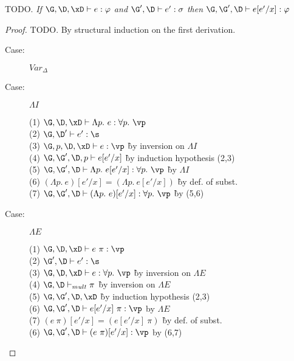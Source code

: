 
\begin{lemma}
  TODO.
\emph{If $\G, \D, \xD \vdash e : \varphi$ and $\G', \D \vdash e' : \sigma$
        then $\G, \G', \D \vdash e[e'/x] : \varphi$}
\end{lemma}
\begin{proof}
TODO. By structural induction on the first derivation.

\begin{description}

\item[Case:] $Var_\Delta$
\begin{tabbing}
\end{tabbing}

\item[Case:] $\Lambda I$
\begin{tabbing}
    (1) $\G,\D, \xD \vdash \Lambda p.~e : \forall p.~\vp$\\
    (2) $\G, \D' \vdash e' : \s$\\
    (3) $\G, p, \D, \xD \vdash e : \vp$ \` by inversion on $\Lambda I$\\
    (4) $\G, \G', \D, p \vdash e[e'/x]$ \` by induction hypothesis (2,3)\\
    (5) $\G, \G', \D \vdash \Lambda p.~e[e'/x] : \forall p.~\vp$ \` by $\Lambda I$ \\
    (6) $(\Lambda p.~e)[e'/x] = (\Lambda p.~e[e'/x])$ \` by def. of subst.\\
    (7) $\G, \G', \D \vdash (\Lambda p.~e)[e'/x] : \forall p.~\vp$ \` by (5,6)\\
\end{tabbing}

\item[Case:] $\Lambda E$
\begin{tabbing}
    (1) $\G, \D, \xD \vdash e~\pi : \vp$\\
    (2) $\G', \D \vdash e' : \s$\\
    (3) $\G, \D, \xD \vdash e : \forall p.~\vp$ \` by inversion on $\Lambda E$\\
    (4) $\G, \D \vdash_{mult} \pi$ \` by inversion on $\Lambda E$\\
    (5) $\G, \G', \D, \xD$ \` by induction hypothesis (2,3)\\
    (6) $\G, \G', \D \vdash e[e'/x]~\pi : \vp$ by $\Lambda E$\\
    (7) $(e~\pi)[e'/x] = (e[e'/x]~\pi)$ \` by def. of subst.\\
    (6) $\G, \G', \D \vdash (e~\pi)[e'/x] : \vp$ by (6,7)\\
\end{tabbing}


\end{description}
\end{proof}
